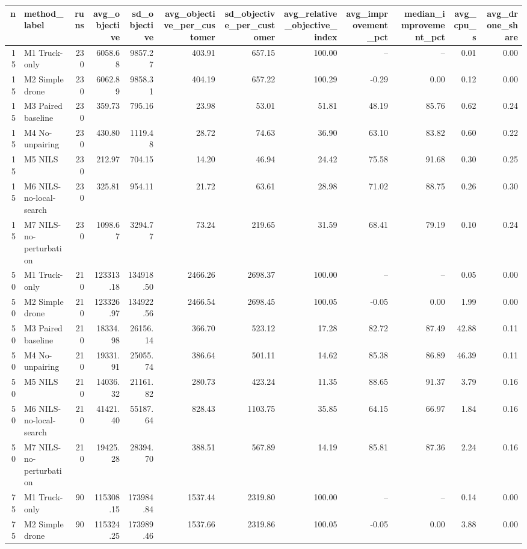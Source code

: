 \begin{tabular}{rlrrrrrrrrrr}
\toprule
n & method_label & runs & avg_objective & sd_objective & avg_objective_per_customer & sd_objective_per_customer & avg_relative_objective_index & avg_improvement_pct & median_improvement_pct & avg_cpu_s & avg_drone_share \\
\midrule
15 & M1 Truck-only & 230 & 6058.68 & 9857.27 & 403.91 & 657.15 & 100.00 & -- & -- & 0.01 & 0.00 \\
15 & M2 Simple drone & 230 & 6062.89 & 9858.31 & 404.19 & 657.22 & 100.29 & -0.29 & 0.00 & 0.12 & 0.00 \\
15 & M3 Paired baseline & 230 & 359.73 & 795.16 & 23.98 & 53.01 & 51.81 & 48.19 & 85.76 & 0.62 & 0.24 \\
15 & M4 No-unpairing & 230 & 430.80 & 1119.48 & 28.72 & 74.63 & 36.90 & 63.10 & 83.82 & 0.60 & 0.22 \\
15 & M5 NILS & 230 & 212.97 & 704.15 & 14.20 & 46.94 & 24.42 & 75.58 & 91.68 & 0.30 & 0.25 \\
15 & M6 NILS-no-local-search & 230 & 325.81 & 954.11 & 21.72 & 63.61 & 28.98 & 71.02 & 88.75 & 0.26 & 0.30 \\
15 & M7 NILS-no-perturbation & 230 & 1098.67 & 3294.77 & 73.24 & 219.65 & 31.59 & 68.41 & 79.19 & 0.10 & 0.24 \\
50 & M1 Truck-only & 210 & 123313.18 & 134918.50 & 2466.26 & 2698.37 & 100.00 & -- & -- & 0.05 & 0.00 \\
50 & M2 Simple drone & 210 & 123326.97 & 134922.56 & 2466.54 & 2698.45 & 100.05 & -0.05 & 0.00 & 1.99 & 0.00 \\
50 & M3 Paired baseline & 210 & 18334.98 & 26156.14 & 366.70 & 523.12 & 17.28 & 82.72 & 87.49 & 42.88 & 0.11 \\
50 & M4 No-unpairing & 210 & 19331.91 & 25055.74 & 386.64 & 501.11 & 14.62 & 85.38 & 86.89 & 46.39 & 0.11 \\
50 & M5 NILS & 210 & 14036.32 & 21161.82 & 280.73 & 423.24 & 11.35 & 88.65 & 91.37 & 3.79 & 0.16 \\
50 & M6 NILS-no-local-search & 210 & 41421.40 & 55187.64 & 828.43 & 1103.75 & 35.85 & 64.15 & 66.97 & 1.84 & 0.16 \\
50 & M7 NILS-no-perturbation & 210 & 19425.28 & 28394.70 & 388.51 & 567.89 & 14.19 & 85.81 & 87.36 & 2.24 & 0.16 \\
75 & M1 Truck-only & 90 & 115308.15 & 173984.84 & 1537.44 & 2319.80 & 100.00 & -- & -- & 0.14 & 0.00 \\
75 & M2 Simple drone & 90 & 115324.25 & 173989.46 & 1537.66 & 2319.86 & 100.05 & -0.05 & 0.00 & 3.88 & 0.00 \\

\end{tabular}
